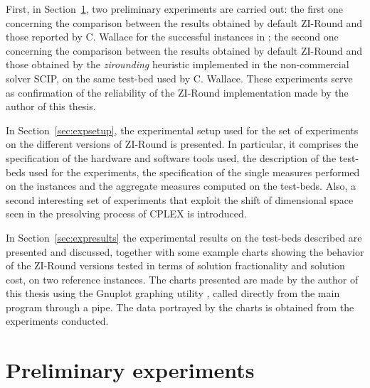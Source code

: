 \documentclass[a4paper,12pt]{book}
\begin{document}
First, in Section~\ref{sec:preliminary-exp}, two preliminary experiments are carried out: the first one concerning the comparison between the results obtained by default ZI-Round and those reported by C. Wallace  for the successful instances in \cite{wallace2010}; the second one concerning the comparison between the results obtained by default ZI-Round and those obtained by the \textit{zirounding} heuristic implemented in the non-commercial solver SCIP, on the same test-bed used by C. Wallace. These experiments serve as confirmation of the reliability of the ZI-Round implementation made by the author of this thesis. \par

In Section~\ref{sec:expsetup}, the experimental setup used for the set of experiments on the different versions of ZI-Round is presented. In particular, it comprises the specification of the hardware and software tools used, the description of the test-beds used for the experiments, the specification of the single measures performed on the instances and the aggregate measures computed on the test-beds. Also, a second interesting set of experiments that exploit the shift of dimensional space seen in the presolving process of CPLEX is introduced. \par 

In Section~\ref{sec:expresults} the experimental results on the test-beds described are presented and discussed, together with some example charts showing the behavior of the ZI-Round versions tested in terms of solution fractionality and solution cost, on two reference instances. The charts presented are made by the author of this thesis using the Gnuplot graphing utility \cite{gnuplot}, called directly from the main program through a pipe. The data portrayed by the charts is obtained from the experiments conducted.

\section{Preliminary experiments} \label{sec:preliminary-exp}
\end{document}
